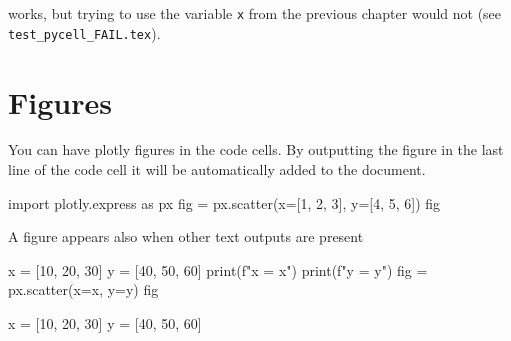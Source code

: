 \documentclass{book}
\begin{document}
works, but trying to use the variable \texttt{x} from the previous chapter would not (see \texttt{test\_pycell\_FAIL.tex}).

\chapter{Figures}

You can have plotly figures in the code cells. By outputting the figure in the last line of the code cell it will be automatically added to the document.

\begin{pycell}
import plotly.express as px
fig = px.scatter(x=[1, 2, 3], y=[4, 5, 6])
fig
\end{pycell}

A figure appears also when other text outputs are present
\begin{pycell}
x = [10, 20, 30]
y = [40, 50, 60]
print(f"x = {x}")
print(f"y = {y}")
fig = px.scatter(x=x, y=y)
fig
\end{pycell}
\begin{pyexpectedoutput}
x = [10, 20, 30]
y = [40, 50, 60]
\end{pyexpectedoutput}
\end{document}
